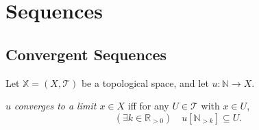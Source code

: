 \chapter{Sequences}


\section{Convergent Sequences}


\begin{definition}
	\label{def: convergent sequence}
	Let $\mathbb X = (X, \mathcal T)$ be a topological space, and let $u: \mathbb N \to X$.
	
	$u$ \textit{converges to a limit $x \in X$} iff for any $U \in \mathcal T$ with $x \in U$,
	$$
	(\exists k \in \mathbb R_{> 0}) \quad u[\mathbb N_{> k}] \subseteq U.
	$$
\end{definition}


